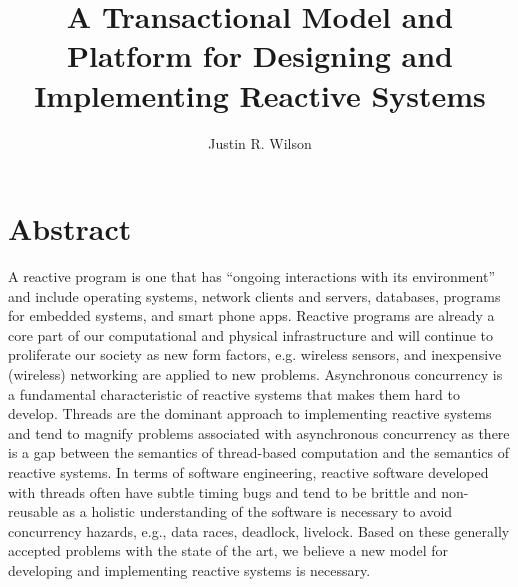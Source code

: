 \documentclass[letterpaper]{book}
\title{A Transactional Model and Platform for Designing and Implementing Reactive Systems}
\author{Justin R. Wilson}
\date{}
\begin{document}
\VerbatimFootnotes

\maketitle

\chapter*{Abstract}

A reactive program is one that has ``ongoing interactions with its environment\cite{manna1992temporal}'' and include operating systems, network clients and servers, databases, programs for embedded systems, and smart phone apps.
Reactive programs are already a core part of our computational and physical infrastructure and will continue to proliferate our society as new form factors, e.g. wireless sensors, and inexpensive (wireless) networking are applied to new problems.
Asynchronous concurrency is a fundamental characteristic of reactive systems that makes them hard to develop.
Threads are the dominant approach to implementing reactive systems and tend to magnify problems associated with asynchronous concurrency as there is a gap between the semantics of thread-based computation and the semantics of reactive systems.
In terms of software engineering, reactive software developed with threads often have subtle timing bugs and tend to be brittle and non-reusable as a holistic understanding of the software is necessary to avoid concurrency hazards, e.g., data races, deadlock, livelock.
Based on these generally accepted problems with the state of the art, we believe a new model for developing and implementing reactive systems is necessary.
\end{document}
